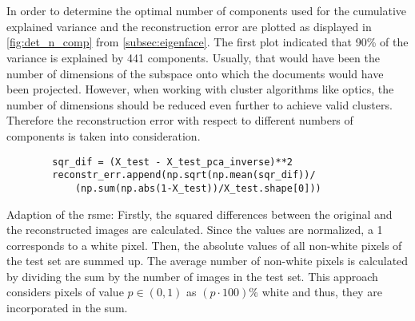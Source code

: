 \section{\eigendocs{}}\label{sec:evaluation-eigendocs}

In order to determine the optimal number of components used for \eigendocs{} the cumulative explained variance and the reconstruction error are plotted 
as displayed in \autoref{fig:det_n_comp} from \autoref{subsec:eigenface}.
The first plot indicated that 90\% of the variance is explained by 441 components.
Usually, that would have been the number of dimensions of the subspace onto which the documents would have been projected.
However, when working with cluster algorithms like \ac{optics}, the number of dimensions should be reduced even further to achieve valid clusters.
Therefore the reconstruction error with respect to different numbers of components is taken into consideration.

\begin{listing}[htp]
    \begin{verbatim}
        sqr_dif = (X_test - X_test_pca_inverse)**2
        reconstr_err.append(np.sqrt(np.mean(sqr_dif))/
            (np.sum(np.abs(1-X_test))/X_test.shape[0])) 
    \end{verbatim}
    \caption[Adaption of the \ac{rsme}]{
        Adaption of the \ac{rsme}: 
        Firstly, the squared differences between the original and the reconstructed images are calculated.
        Since the values are normalized, a 1 corresponds to a white pixel.
        Then, the absolute values of all non-white pixels of the test set are summed up.
        The average number of non-white pixels is calculated by dividing the sum by the number of images in the test set.
        This approach considers pixels of value $p \in (0,1)$ as $(p \cdot 100)$\% white and thus, they are incorporated in the sum.
    }
    \label{lst:impl-weighted-rsme}
\end{listing}

